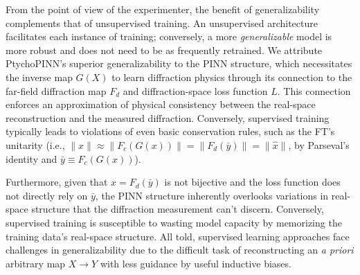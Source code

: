 \documentclass[sn-mathphys]{sn-jnl}%
\theoremstyle{thmstyleone}%
\theoremstyle{thmstyletwo}%
\theoremstyle{thmstylethree}%
\begin{document}
From the point of view of the experimenter, the benefit of generalizability complements that of unsupervised training. An unsupervised architecture facilitates each instance of training; conversely, a more \emph{generalizable} model is more robust and does not need to be as frequently retrained. We attribute PtychoPINN's superior generalizability to the PINN structure, which necessitates the inverse map $G(X)$ to learn diffraction physics through its connection to the far-field diffraction map $F_d$ and diffraction-space loss function $L$. This connection enforces an approximation of physical consistency between the real-space reconstruction and the measured diffraction. Conversely, supervised training typically leads to violations of even basic conservation rules, such as the FT's unitarity (i.e., $\lVert x \rVert \approx \lVert F_c(G(x)) \rVert = \lVert F_d(\bar{y}) \rVert = \lVert \hat{x} \rVert$, by Parseval's identity and $\bar{y} \equiv F_c(G(x))$). 

Furthermore, given that $\hat{x} = F_d(\bar{y})$ is not bijective and the loss function does not directly rely on $\bar{y}$, the PINN structure inherently overlooks variations in real-space structure that the diffraction measurement can't discern. Conversely, supervised training is susceptible to wasting model capacity by memorizing the training data's real-space structure. All told, supervised learning approaches face challenges in generalizability due to the difficult task of reconstructing an \emph{a priori} arbitrary map $X \rightarrow Y$ with less guidance by useful inductive biases.

\end{document}
